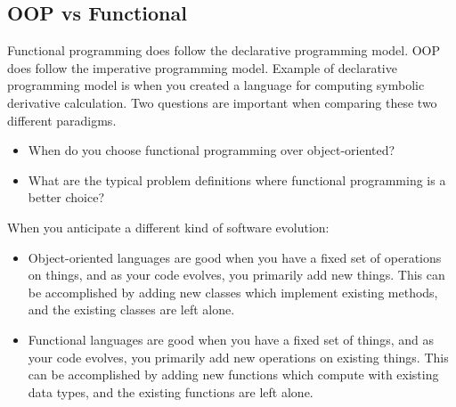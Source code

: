 \documentclass[a4paper,twoside]{article}
\numberwithin{equation}{section}
\begin{document}
\subsection{OOP vs Functional}
Functional programming does follow the declarative programming model. OOP does follow the imperative
programming model. Example of declarative programming model is when you created a language for
computing symbolic derivative calculation.
Two questions are important when comparing these two different paradigms.
\begin{itemize}
    \item When do you choose functional programming over object-oriented?
    \item What are the typical problem definitions where functional programming is a better choice?
\end{itemize}
When you anticipate a different kind of software evolution:
\begin{itemize}
    \item Object-oriented languages are good when you have a fixed set of operations on things,
          and as your code evolves, you primarily add new things. This can be accomplished by
          adding new
          classes which implement existing methods, and the existing classes are left alone.
    \item Functional languages are good when you have a fixed set of things, and as your
          code evolves, you primarily add new operations on existing things. This can be accomplished by
          adding new functions which compute with existing data types, and the existing functions are left
          alone.
\end{itemize}
\end{document}
